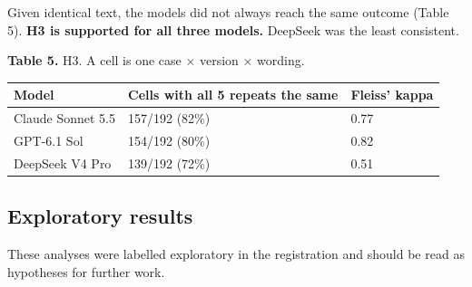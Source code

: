 \documentclass[11pt]{article}
\begin{document}
Given identical text, the models did not always reach the same outcome (Table 5). \textbf{H3 is supported for all three models.} DeepSeek was the least consistent.

\noindent\textbf{Table 5.} H3. A cell is one case × version × wording.

\begin{longtable}[]{@{}lll@{}}
\toprule\noalign{}
Model & Cells with all 5 repeats the same & Fleiss' kappa \\
\midrule\noalign{}
\endhead
\bottomrule\noalign{}
\endlastfoot
Claude Sonnet 5.5 & 157/192 (82\%) & 0.77 \\
GPT-6.1 Sol & 154/192 (80\%) & 0.82 \\
DeepSeek V4 Pro & 139/192 (72\%) & 0.51 \\
\end{longtable}


\hypertarget{exploratory-results}{%
\subsection{Exploratory results}\label{exploratory-results}}

These analyses were labelled exploratory in the registration and should be read as hypotheses for further work.
\end{document}
